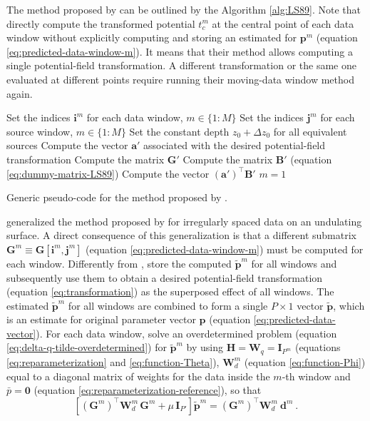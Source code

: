 The method proposed by \cite{leao-silva1989} can be outlined by the Algorithm \ref{alg:LS89}.
Note that \cite{leao-silva1989} directly compute the transformed potential $t^{m}_{c}$ at the central point of
each data window without explicitly computing and storing an estimated for $\mathbf{p}^{m}$ (equation \ref{eq:predicted-data-window-m}).
It means that their method allows computing a single potential-field transformation. 
A different transformation or the same one evaluated at different points require running their moving-data window method again.

\begin{algorithm}
	\Input{}
	Set the indices $\mathbf{i}^{m}$ for each data window, $m \in \{ 1 : M \}$ \;
	Set the indices $\mathbf{j}^{m}$ for each source window, $m \in \{ 1 : M \}$ \;
	Set the constant depth $z_{0} + \Delta z_{0}$ for all equivalent sources \;
	Compute the vector $\mathbf{a}'$ associated with the desired potential-field transformation \;
	Compute the matrix $\mathbf{G}'$ \;
	Compute the matrix $\mathbf{B}'$ (equation \ref{eq:dummy-matrix-LS89}) \;
	Compute the vector $\left( \mathbf{a}' \right)^{\top} \mathbf{B}'$ \;
	$m = 1$ \;
	\caption{Generic pseudo-code for the method proposed by \cite{leao-silva1989}.}
	\label{alg:LS89}
\end{algorithm}

\cite{soler-uieda2021} generalized the method proposed by \cite{leao-silva1989} for irregularly spaced data on an undulating surface.
A direct consequence of this generalization is that a different submatrix $\mathbf{G}^{m} \equiv \mathbf{G}[\mathbf{i}^{m}, \mathbf{j}^{m}]$ 
(equation \ref{eq:predicted-data-window-m}) must be computed for each window.
Differently from \cite{leao-silva1989}, \cite{soler-uieda2021} store the computed $\tilde{\mathbf{p}}^{m}$ for all windows and
subsequently use them to obtain a desired potential-field transformation (equation \ref{eq:transformation}) as the superposed
effect of all windows.
The estimated $\tilde{\mathbf{p}}^{m}$ for all windows are combined to form a single $P \times 1$ vector $\tilde{\mathbf{p}}$,
which is an estimate for original parameter vector $\mathbf{p}$ (equation \ref{eq:predicted-data-vector}).
For each data window, \cite{soler-uieda2021} solve an overdetermined problem (equation \ref{eq:delta-q-tilde-overdetermined}) 
for $\tilde{\mathbf{p}}^{m}$ by using 
$\mathbf{H} = \mathbf{W}_{q} = \mathbf{I}_{P^{m}}$ (equations \ref{eq:reparameterization} and \ref{eq:function-Theta}),
$\mathbf{W}^{m}_{d}$ (equation \ref{eq:function-Phi}) equal to a diagonal matrix of weights for the data inside the $m$-th window
and $\bar{p} = \mathbf{0}$ (equation \ref{eq:reparameterization-reference}), so that
\begin{equation}
	\left[ \left( \mathbf{G}^{m} \right)^{\top} \mathbf{W}^{m}_{d} \, \mathbf{G}^{m} + 
	\mu \, \mathbf{I}_{P'} \right] 
	\tilde{\mathbf{p}}^{m} = 
	\left( \mathbf{G}^{m} \right)^{\top} \mathbf{W}^{m}_{d} \: 
	\mathbf{d}^{m} \: .
	\label{eq:p-tilde-m-SU21}
\end{equation}

